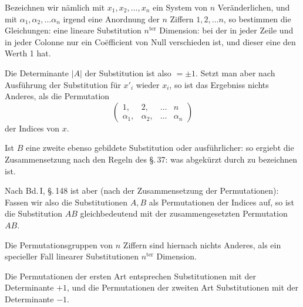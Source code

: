 
Bezeichnen wir nämlich mit $x_1, x_2, \dots, x_n$ ein System von $n$ Veränderlichen, und mit $\alpha_1, \alpha_2, \dots \alpha_n$ irgend eine Anordnung der $n$ Ziffern $1, 2, \dots n$, so bestimmen die Gleichungen:
eine lineare Substitution $n^{\mathrm{ter}}$ Dimension:
bei der in jeder Zeile und in jeder Colonne nur ein Coëfficient von Null verschieden ist, und dieser eine den Werth 1 hat.

Die Determinante $|A|$ der Substitution ist also $= \pm 1$. Setzt man aber nach Ausführung der Substitution für $x'_i$ wieder $x_i$, so ist das Ergebniss nichts Anderes, als die Permutation
\[
\begin{pmatrix} 1, & 2, & \dots & n \\ \alpha_1, & \alpha_2, & \dots & \alpha_n \end{pmatrix}
\]
der Indices von $x$.

Ist $B$ eine zweite ebenso gebildete Substitution
oder ausführlicher:
so ergiebt die Zusammensetzung nach den Regeln des \S.\,37:
was abgekürzt durch
zu bezeichnen ist.

Nach Bd.\,I, \S.\,148 ist aber (nach der Zusammensetzung der Permutationen):
Fassen wir also die Substitutionen $A, B$ als Permutationen der Indices auf, so ist die Substitution $AB$ gleichbedeutend mit der zusammengesetzten Permutation $AB$.

Die Permutationsgruppen von $n$ Ziffern sind hiernach nichts Anderes, als ein specieller Fall  linearer Substitutionen $n^{\mathrm{ter}}$ Dimension.

Die Permutationen der ersten Art entsprechen Substitutionen mit der Determinante $+1$, und die Permutationen der zweiten Art Substitutionen mit der Determinante $-1$.
